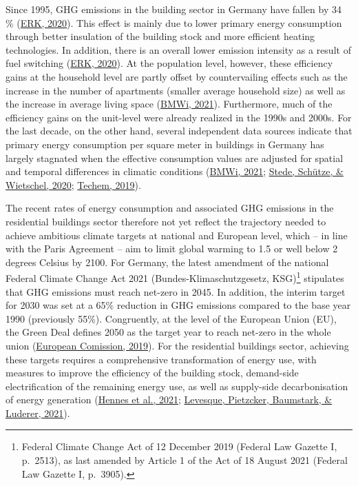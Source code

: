 \documentclass[12pt,twoside]{reedthesis}
\begin{document}
Since 1995, GHG emissions in the building sector in Germany have fallen by 34 \% (\protect\hyperlink{ref-erk20}{ERK, 2020}). This effect is mainly due to lower primary energy consumption through better insulation of the building stock and more efficient heating technologies. In addition, there is an overall lower emission intensity as a result of fuel switching (\protect\hyperlink{ref-erk20}{ERK, 2020}). At the population level, however, these efficiency gains at the household level are partly offset by countervailing effects such as the increase in the number of apartments (smaller average household size) as well as the increase in average living space (\protect\hyperlink{ref-bmwi21}{BMWi, 2021}). Furthermore, much of the efficiency gains on the unit-level were already realized in the 1990s and 2000s. For the last decade, on the other hand, several independent data sources indicate that primary energy consumption per square meter in buildings in Germany has largely stagnated when the effective consumption values are adjusted for spatial and temporal differences in climatic conditions (\protect\hyperlink{ref-bmwi21}{BMWi, 2021}; \protect\hyperlink{ref-stede_etal20}{Stede, Schütze, \& Wietschel, 2020}; \protect\hyperlink{ref-techem19}{Techem, 2019}).

The recent rates of energy consumption and associated GHG emissions in the residential buildings sector therefore not yet reflect the trajectory needed to achieve ambitious climate targets at national and European level, which -- in line with the Paris Agreement -- aim to limit global warming to 1.5 or well below 2 degrees Celsius by 2100. For Germany, the latest amendment of the national Federal Climate Change Act 2021 (Bundes-Klimaschutzgesetz, KSG)\footnote{Federal Climate Change Act of 12 December 2019 (Federal Law Gazette I, p.~2513), as last amended by Article 1 of the Act of 18 August 2021 (Federal Law Gazette I, p.~3905).} stipulates that GHG emissions must reach net-zero in 2045. In addition, the interim target for 2030 was set at a 65\% reduction in GHG emissions compared to the base year 1990 (previously 55\%). Congruently, at the level of the European Union (EU), the Green Deal defines 2050 as the target year to reach net-zero in the whole union (\protect\hyperlink{ref-europeancomission19}{European Comission, 2019}). For the residential buildings sector, achieving these targets requires a comprehensive transformation of energy use, with measures to improve the efficiency of the building stock, demand-side electrification of the remaining energy use, as well as supply-side decarbonisation of energy generation (\protect\hyperlink{ref-hennes_etal21}{Hennes et al., 2021}; \protect\hyperlink{ref-levesque_etal21}{Levesque, Pietzcker, Baumstark, \& Luderer, 2021}).
\end{document}
